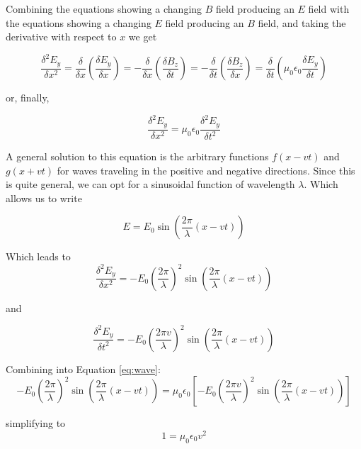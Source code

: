 \documentclass[14pt]{memoir}
\begin{document}
Combining the equations showing a changing $B$ field producing an $E$ field with the equations showing a changing $E$ field producing an $B$ field, and taking the derivative with respect to $x$ we get

\begin{equation}
\frac{\delta^2 E_y}{\delta x^2} = \frac{\delta}{\delta x} (\frac{\delta E_y}{\delta x}) = - \frac{\delta}{\delta x} (\frac{\delta B_z}{\delta t}) = - \frac{\delta}{\delta t} (\frac{\delta B_z}{\delta x}) =  \frac{\delta}{\delta t} (\mu_0 \epsilon_0 \frac{\delta E_y}{\delta t})
\end{equation}

or, finally,

\begin{equation}
\frac{\delta^2 E_y}{\delta x^2} =   \mu_0 \epsilon_0 \frac{\delta^2 E_y}{\delta t^2}
\label{eq:wave}
\end{equation}

A general solution to this equation is the arbitrary functions $f(x - vt)$ and $g(x + vt)$ for waves traveling in the positive and negative directions. Since this is quite general, we can opt for a sinusoidal function of wavelength $\lambda$. Which allows us to write

\begin{equation}
E = E_0 \sin{(\frac{2 \pi}{\lambda}(x - vt))}
\end{equation}

Which leads to
\begin{equation}
\frac{\delta^2 E_y}{\delta x^2} =   -E_0 (\frac{2 \pi}{\lambda})^2 \sin{(\frac{2 \pi}{\lambda}(x - vt))}
\end{equation}

and

\begin{equation}
\frac{\delta^2 E_y}{\delta t^2} =   -E_0 (\frac{2 \pi v}{\lambda})^2 \sin{(\frac{2 \pi}{\lambda}(x - vt))}
\end{equation}

Combining into Equation \ref{eq:wave}:
\begin{equation}
-E_0 (\frac{2 \pi}{\lambda})^2 \sin{(\frac{2 \pi}{\lambda}(x - vt))} = \mu_0 \epsilon_0 [-E_0 (\frac{2 \pi v}{\lambda})^2 \sin{(\frac{2 \pi}{\lambda}(x - vt))}]
\end{equation}

simplifying to
\begin{equation}
1 = \mu_0 \epsilon_0 v^2
\end{equation}
\end{document}
